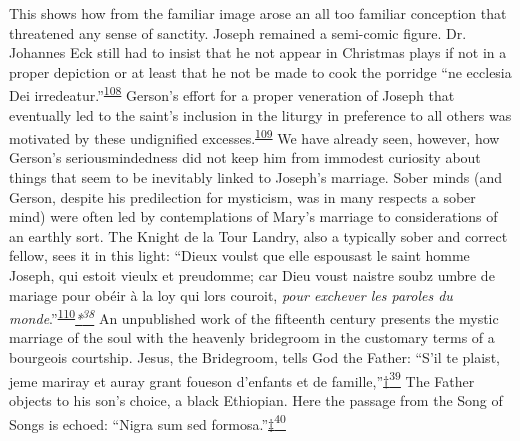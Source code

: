 This shows how from the familiar image arose an all too familiar
conception that threatened any sense of sanctity. Joseph remained a
semi-comic figure. Dr. Johannes Eck still had to insist that he not
appear in Christmas plays if not in a proper depiction or at least that
he not be made to cook the porridge ``ne ecclesia Dei
irredeatur.''\textsuperscript{\protect\hypertarget{13_Chapter_Six__THE_DEPICTION_OF_TH.xhtmlux5cux23id_1057}{\protect\hyperlink{23_NOTES.xhtmlux5cux23page_420}{108}}}
Gerson's effort for a proper veneration of Joseph that eventually led to
the saint's inclusion in the liturgy in preference to all others was
motivated by these undignified
excesses.\textsuperscript{\protect\hypertarget{13_Chapter_Six__THE_DEPICTION_OF_TH.xhtmlux5cux23id_1055}{\protect\hyperlink{23_NOTES.xhtmlux5cux23id_1056}{109}}}
We have already seen, however, how Gerson's seriousmindedness did not
keep him from immodest curiosity about things that seem to be inevitably
linked to Joseph's marriage. Sober minds (and Gerson, despite his
predilection for mysticism, was in many respects a sober mind) were
often led by contemplations of Mary's marriage to considerations of an
earthly sort. The Knight de la Tour Landry, also a typically sober and
correct fellow, sees it in this light: ``Dieux voulst que elle espousast
le saint homme Joseph, qui estoit vieulx
\protect\hypertarget{13_Chapter_Six__THE_DEPICTION_OF_TH.xhtmlux5cux23page_196}{}{}et
preudomme; car Dieu voust naistre soubz umbre de mariage pour obéir à la
loy qui lors couroit, \emph{pour exchever les paroles du
monde}.''\textsuperscript{\protect\hypertarget{13_Chapter_Six__THE_DEPICTION_OF_TH.xhtmlux5cux23id_1053}{\protect\hyperlink{23_NOTES.xhtmlux5cux23id_1054}{110}}}\emph{\protect\hypertarget{13_Chapter_Six__THE_DEPICTION_OF_TH.xhtmlux5cux23id_3165}{\protect\hyperlink{23_NOTES.xhtmlux5cux23id_3166}{*\textsuperscript{38}}}}
An unpublished work of the fifteenth century presents the mystic
marriage of the soul with the heavenly bridegroom in the customary terms
of a bourgeois courtship. Jesus, the Bridegroom, tells God the Father:
``S'il te plaist, jeme mariray et auray grant foueson d'enfants et de
famille,''\protect\hypertarget{13_Chapter_Six__THE_DEPICTION_OF_TH.xhtmlux5cux23id_3167}{\protect\hyperlink{23_NOTES.xhtmlux5cux23id_3168}{†\textsuperscript{39}}}
The Father objects to his son's choice, a black Ethiopian. Here the
passage from the Song of Songs is echoed: ``Nigra sum sed
formosa.''\protect\hypertarget{13_Chapter_Six__THE_DEPICTION_OF_TH.xhtmlux5cux23id_3169}{\protect\hyperlink{23_NOTES.xhtmlux5cux23id_3170}{‡\textsuperscript{40}}}
